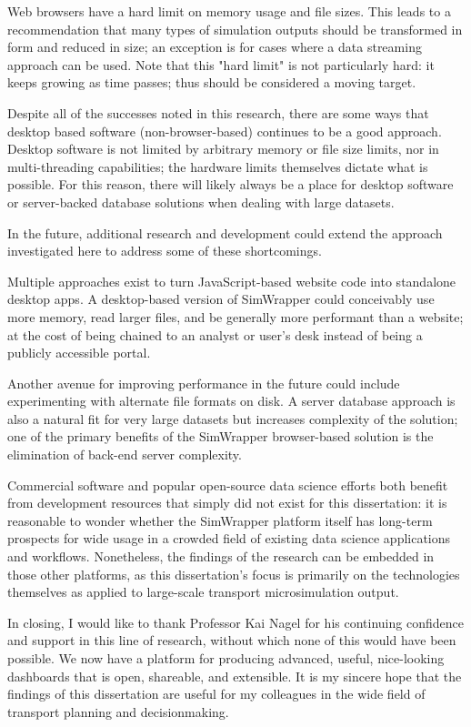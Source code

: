 Web browsers have a hard limit on memory usage and file sizes. This leads to a recommendation that many types of simulation outputs should be transformed in form and reduced in size; an exception is for cases where a data streaming approach can be used. Note that this "hard limit" is not particularly hard: it keeps growing as time passes; thus should be considered a moving target.

Despite all of the successes noted in this research, there are some ways that desktop based software (non-browser-based) continues to be a good approach. Desktop software is not limited by arbitrary memory or file size limits, nor in multi-threading capabilities; the hardware limits themselves dictate what is possible. For this reason, there will likely always be a place for desktop software or server-backed database solutions when dealing with large datasets.

In the future, additional research and development could extend the approach investigated here to address some of these shortcomings.

Multiple approaches exist to turn JavaScript-based website code into standalone desktop apps. A desktop-based version of SimWrapper could conceivably use more memory, read larger files, and be generally more performant than a website; at the cost of being chained to an analyst or user's desk instead of being a publicly accessible portal.

Another avenue for improving performance in the future could include experimenting with alternate file formats on disk. A server database approach is also a natural fit for very large datasets but increases complexity of the solution; one of the primary benefits of the SimWrapper browser-based solution is the elimination of back-end server complexity.

Commercial software and popular open-source data science efforts both benefit from development resources that simply did not exist for this dissertation: it is reasonable to wonder whether the SimWrapper platform itself has long-term prospects for wide usage in a crowded field of existing data science applications and workflows. Nonetheless, the findings of the research can be embedded in those other platforms, as this dissertation's focus is primarily on the technologies themselves as applied to large-scale transport microsimulation output.

In closing, I would like to thank Professor Kai Nagel for his continuing confidence and support in this line of research, without which none of this would have been possible. We now have a platform for producing advanced, useful, nice-looking dashboards that is open, shareable, and extensible. It is my sincere hope that the findings of this dissertation are useful for my colleagues in the wide field of transport planning and decisionmaking.
